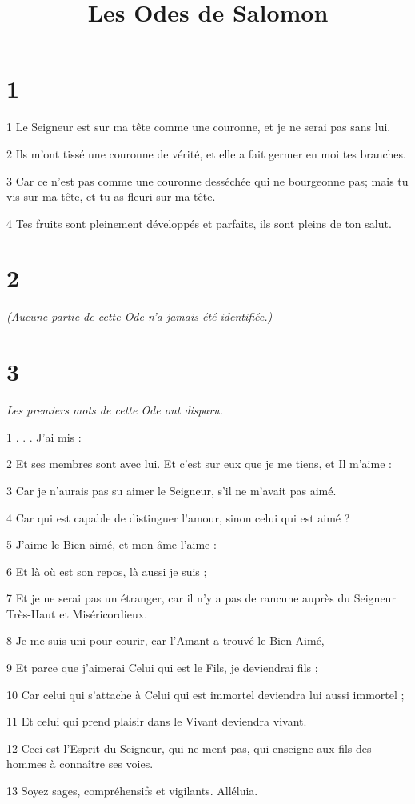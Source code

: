 

\title{Les Odes de Salomon}

\chapter{1}

\par 1 Le Seigneur est sur ma tête comme une couronne, et je ne serai pas sans lui.
\par 2 Ils m'ont tissé une couronne de vérité, et elle a fait germer en moi tes branches.
\par 3 Car ce n'est pas comme une couronne desséchée qui ne bourgeonne pas; mais tu vis sur ma tête, et tu as fleuri sur ma tête.
\par 4 Tes fruits sont pleinement développés et parfaits, ils sont pleins de ton salut.



\chapter{2}

\par \textit{(Aucune partie de cette Ode n'a jamais été identifiée.)}

\chapter{3}

\par \textit{Les premiers mots de cette Ode ont disparu.}

\par 1 . . . J'ai mis :
\par 2 Et ses membres sont avec lui. Et c'est sur eux que je me tiens, et Il m'aime :
\par 3 Car je n'aurais pas su aimer le Seigneur, s'il ne m'avait pas aimé.
\par 4 Car qui est capable de distinguer l'amour, sinon celui qui est aimé ?
\par 5 J'aime le Bien-aimé, et mon âme l'aime :
\par 6 Et là où est son repos, là aussi je suis ;
\par 7 Et je ne serai pas un étranger, car il n'y a pas de rancune auprès du Seigneur Très-Haut et Miséricordieux.
\par 8 Je me suis uni pour courir, car l'Amant a trouvé le Bien-Aimé,
\par 9 Et parce que j'aimerai Celui qui est le Fils, je deviendrai fils ;
\par 10 Car celui qui s'attache à Celui qui est immortel deviendra lui aussi immortel ;
\par 11 Et celui qui prend plaisir dans le Vivant deviendra vivant.
\par 12 Ceci est l'Esprit du Seigneur, qui ne ment pas, qui enseigne aux fils des hommes à connaître ses voies.
\par 13 Soyez sages, compréhensifs et vigilants. Alléluia.

